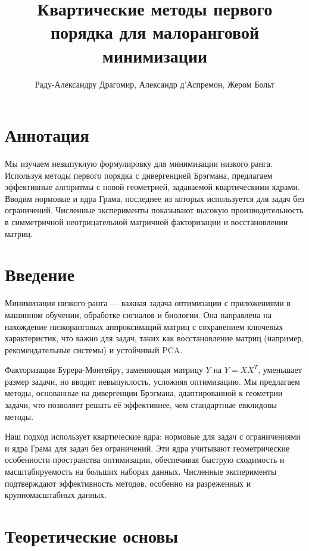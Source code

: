 \documentclass[a4paper,11pt]{article}
\title{Квартические методы первого порядка для малоранговой минимизации}
\author{Раду-Александру Драгомир, Александр д'Аспремон, Жером Больт}
\date{}
\begin{document}
\maketitle
\tableofcontents
\newpage

\section*{Аннотация}
Мы изучаем невыпуклую формулировку для минимизации низкого ранга. Используя методы первого порядка с дивергенцией Брэгмана, предлагаем эффективные алгоритмы с новой геометрией, задаваемой квартическими ядрами. Вводим нормовые и ядра Грама, последнее из которых используется для задач без ограничений. Численные эксперименты показывают высокую производительность в симметричной неотрицательной матричной факторизации и восстановлении матриц.

\section{Введение}
Минимизация низкого ранга — важная задача оптимизации с приложениями в машинном обучении, обработке сигналов и биологии. Она направлена на нахождение низкоранговых аппроксимаций матриц с сохранением ключевых характеристик, что важно для задач, таких как восстановление матриц (например, рекомендательные системы) и устойчивый PCA.

Факторизация Бурера-Монтейру, заменяющая матрицу \( Y \) на \( Y = XX^T \), уменьшает размер задачи, но вводит невыпуклость, усложняя оптимизацию. Мы предлагаем методы, основанные на дивергенции Брэгмана, адаптированной к геометрии задачи, что позволяет решать её эффективнее, чем стандартные евклидовы методы.

Наш подход использует квартические ядра: нормовые для задач с ограничениями и ядра Грама для задач без ограничений. Эти ядра учитывают геометрические особенности пространства оптимизации, обеспечивая быструю сходимость и масштабируемость на больших наборах данных. Численные эксперименты подтверждают эффективность методов, особенно на разреженных и крупномасштабных данных.

\section{Теоретические основы}
\end{document}
